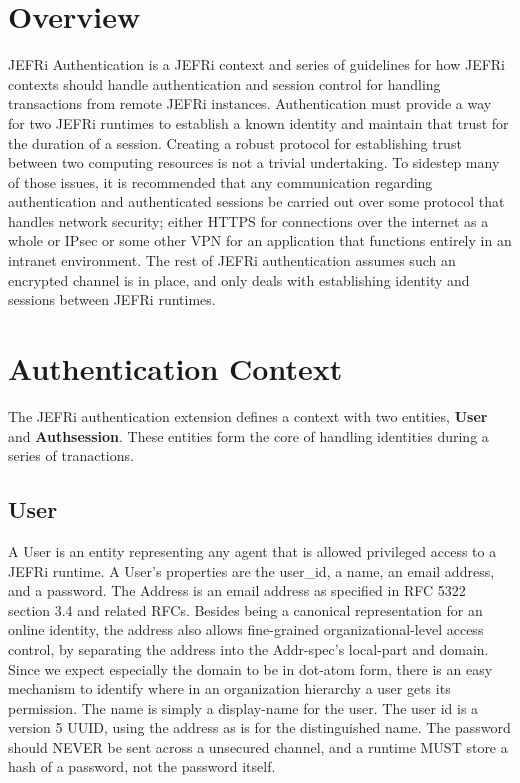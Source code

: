 \documentclass{article}
\begin{document}
\maketitle
\tableofcontents
\newpage
\linespread{1.6}

\section{Overview}
JEFRi Authentication is a JEFRi context and series of guidelines for how JEFRi
contexts should handle authentication and session control for handling
transactions from remote JEFRi instances. Authentication must provide a way for
two JEFRi runtimes to establish a known identity and maintain that trust for the
duration of a session. Creating a robust protocol for establishing trust between
two computing resources is not a trivial undertaking. To sidestep many of those
issues, it is recommended that any communication regarding authentication and
authenticated sessions be carried out over some protocol that handles network
security; either HTTPS for connections over the internet as a whole or IPsec or
some other VPN for an application that functions entirely in an intranet
environment. The rest of JEFRi authentication assumes such an encrypted channel
is in place, and only deals with establishing identity and sessions between
JEFRi runtimes.

\section{Authentication Context}
The JEFRi authentication extension defines a context with two entities, {\bf
User} and {\bf Authsession}. These entities form the core of handling identities
during a series of tranactions.

\subsection{User}
A User is an entity representing any agent that is allowed privileged access to
a JEFRi runtime. A User's properties are the user\_id, a name, an email address,
and a password. The Address is an email address as specified in RFC 5322 section
3.4 and related RFCs. Besides being a canonical representation for an online
identity, the address also allows fine-grained organizational-level access
control, by separating the address into the Addr-spec's local-part and domain.
Since we expect especially the domain to be in dot-atom form, there is an easy
mechanism to identify where in an organization hierarchy a user gets its
permission. The name is simply a display-name for the user. The user id is a
version 5 UUID, using the address as is for the distinguished name. The password
should NEVER be sent across a unsecured channel, and a runtime MUST store a hash
of a password, not the password itself.
\end{document}
